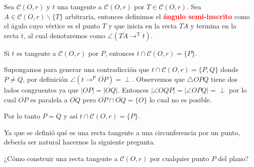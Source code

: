 \begin{df}
Sea $\mathcal{C}(O,r)$ y $t$ una tangente a $\mathcal{C}(O,r)$ por $T\in\mathcal{C}(O,r)$. Sea $A\in\mathcal{C}(O,r)\backslash\{T\}$ arbitraria, entonces definimos el \textcolor{red}{\bf ángulo semi-inscrito} como el águlo cuyo vértice es el punto $T$ y que inicia en la recta $\overline{TA}$ y termina en la recta $t$, al cual denotaremos como $\angle (\overline{TA}\longrightarrow^\text{T}t)$.
\end{df}
\begin{prop}\label{PTP}
Si $t$ es tangente a $\mathcal{C}(O,r)$ por $P$, entonces $t\cap\mathcal{C}(O,r)=\{P\}.$
\end{prop}
\begin{pba}
Supongamos para generar una contradicción que $t\cap\mathcal{C}(O,r)=\{P,Q\}$ donde $P\neq Q$, por definición $\angle (t \longrightarrow^\text{P}\overline{OP})=\perp$. Observemos que $\triangle OPQ$ tiene dos lados congruentes ya que $|OP|=|OQ|$. Entonces $|\angle OQP|=|\angle OPQ|=\perp$ por lo cual $\overline{OP}$ es paralela a $\overline{OQ}$ pero $\overline{OP}\cap\overline{OQ}=\{O\}$ lo cual no es posible. 

Por lo tanto $P=Q$ y así $t\cap\mathcal{C}(O,r)=\{P\}.$
\end{pba}

Ya que se definió qué es una recta tangente a una circunferencia por un punto, debería ser natural hacernos la siguiente pregunta. 

¿Cómo construir una recta tangente a $\mathcal{C}(O,r)$ por cualquier punto $P$ del plano?


